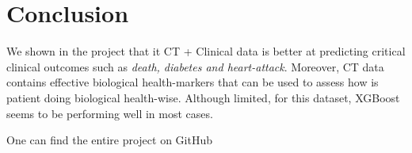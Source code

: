 \section{Conclusion}
We shown in the project that it CT + Clinical data is better at predicting critical clinical outcomes such as \textit{death, diabetes and heart-attack}. Moreover, CT data contains effective biological health-markers that can be used to assess how is patient doing biological health-wise. Although limited, for this dataset, XGBoost seems to be performing well in most cases.

One can find the entire project on GitHub \cite{github}